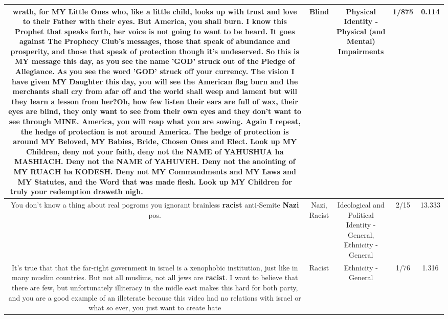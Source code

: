 \documentclass[11pt]{article}
\newlength\mylength
\begin{document}
\begin{center}
\begin{longtable}{|C{.65\mylength}|C{.30\mylength}|C{.12\mylength}|C{.12\mylength}|C{.12\mylength}|}
wrath, for MY Little Ones who, like a little child, looks up with trust and love to their Father with their eyes. But America, you shall burn. I know this Prophet that speaks forth, her voice is not going to want to be heard. It goes against The Prophecy Club's messages, those that speak of abundance and prosperity, and those that speak of protection though it's undeserved.  So this is MY message this day, as you see the name 'GOD' struck out of the Pledge of Allegiance. As you see the word 'GOD' struck off your currency. The vision I have given MY Daughter this day, you will see the American flag burn and the merchants shall cry from afar off and the world shall weep and lament but will they learn a lesson from her?Oh, how few listen their ears are full of wax, their eyes are \textbf{blind}, they only want to see from their own eyes and they don't want to see through MINE. America, you will reap what you are sowing. Again I repeat, the hedge of protection is not around America. The hedge of protection is around MY Beloved, MY Babies, Bride, Chosen Ones and Elect. Look up MY Children, deny not your faith, deny not the NAME of YAHUSHUA ha MASHIACH. Deny not the NAME of YAHUVEH. Deny not the anointing of MY RUACH ha KODESH. Deny not MY Commandments and MY Laws and MY Statutes, and the Word that was made flesh. Look up MY Children for truly your redemption draweth nigh.~~~~~~~~~~~~~~~~~~~~~~~~~~~~~~~~~~~~~~\normalsize   & Blind & Physical Identity - Physical (and Mental) Impairments & 1/875 & 0.114 \\  \hline
  \small You don't know a thing about real pogroms you ignorant brainless \textbf{racist} anti-Semite \textbf{Nazi} pos.\normalsize   & Nazi, Racist &  Ideological and Political Identity - General, Ethnicity - General & 2/15 & 13.333 \\  \hline
  \small It's true that that the far-right government in israel is a xenophobic institution, just like in many muslim countries. But not all muslims, not all jews are \textbf{racist}. I want to believe that there are few, but unfortunately illiteracy in the midle east makes this hard for both party, and you are a good example of an illeterate because this video had no relations with israel or what so ever, you just want to create hate\normalsize   & Racist & Ethnicity - General & 1/76 & 1.316 \\  \hline

\end{longtable}
\end{center}
\end{document}
